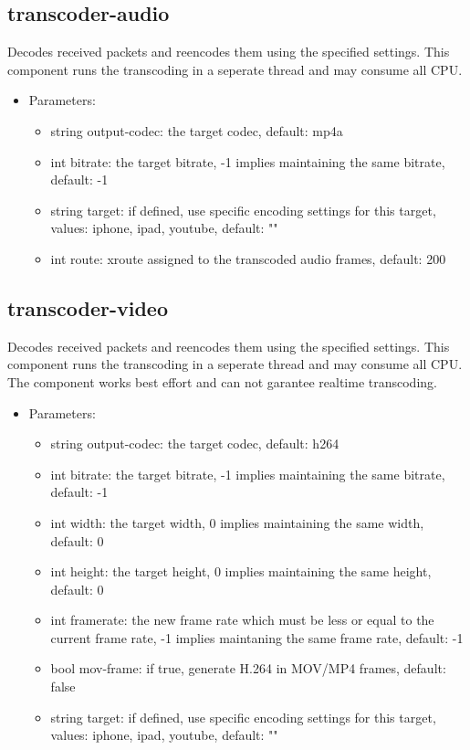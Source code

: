 \subsection{transcoder-audio}
Decodes received packets and reencodes them using the specified settings. This component runs the transcoding in a seperate thread and may consume all CPU.
\begin{itemize}
\item Parameters:
\begin{itemize}
\item string output-codec: the target codec, default: mp4a
\item int bitrate: the target bitrate, -1 implies maintaining the same bitrate, default: -1
\item string target: if defined, use specific encoding settings for this target, values: iphone, ipad, youtube, default: ""
\item int route: xroute assigned to the transcoded audio frames, default: 200
\end{itemize}
\end{itemize}
\subsection{transcoder-video}
Decodes received packets and reencodes them using the specified settings. This component runs the transcoding in a seperate thread and may consume all CPU. The component works best effort and can not garantee realtime transcoding.
\begin{itemize}
\item Parameters:
\begin{itemize}
\item string output-codec: the target codec, default: h264
\item int bitrate: the target bitrate, -1 implies maintaining the same bitrate, default: -1
\item int width: the target width, 0 implies maintaining the same width, default: 0
\item int height: the target height, 0 implies maintaining the same height, default: 0
\item int framerate: the new frame rate which must be less or equal to the current frame rate, -1 implies maintaning the same frame rate, default: -1
\item bool mov-frame: if true, generate H.264 in MOV/MP4 frames, default: false
\item string target: if defined, use specific encoding settings for this target, values: iphone, ipad, youtube, default: ""
\end{itemize}
\end{itemize}
\newpage
